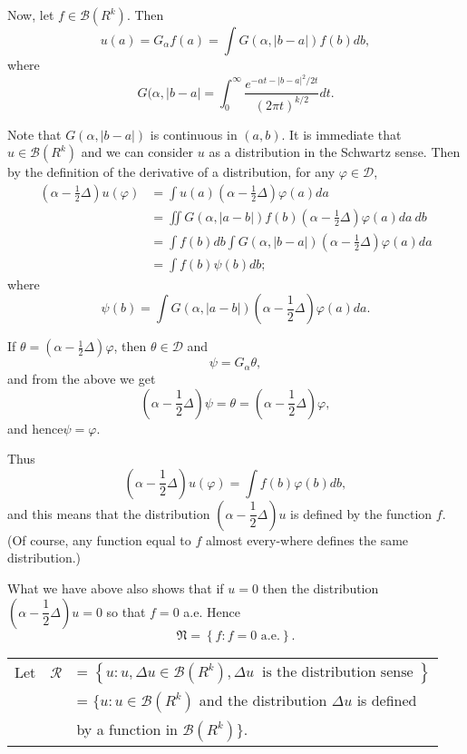 Now, let $f \in \mathscr{B}(R^k)$. Then
$$
u(a) = G_\alpha f (a) = \int G(\alpha, |b-a|)f(b)db,
$$
where 
$$
G(\alpha, |b-a| = \int^\infty_0 \dfrac{e^{- \alpha
    t-|b-a|^2/2t}}{(2 \pi t)^{k/2}} dt.
$$ 

Note that $G(\alpha, |b-a|)$ is continuous in $(a, b)$. It is
immediate that $u \in \mathscr{B}(R^k)$ and we can consider $u$ as a
distribution in the Schwartz sense. Then  by the definition of the
derivative of a distribution, for any $\varphi \in \mathscr{D}$, 
\begin{align*}
\left(\alpha - \frac{1}{2}\Delta\right) u(\varphi) & = \int u(a)
  \left(\alpha -
  \frac{1}{2} \Delta\right)\varphi (a) da \\ 
  & = \iint G(\alpha, |a-b|)f(b) \left(\alpha- \frac{1}{2} \Delta\right) \varphi
  (a) da ~db\\ 
  & =\int f(b) db \int G (\alpha, |b-a|) \left(\alpha- \frac{1}{2} \Delta\right)
  \varphi(a) da \\ 
  & = \int f(b) \psi (b) db ;
\end{align*}\pageoriginale
where
$$
\psi (b) = \int G(\alpha, |a-b|) \left(\alpha -
\frac{1}{2}\Delta\right)\varphi(a) da. 
$$

If $\theta = \left(\alpha - \frac{1}{2} \Delta\right) \varphi$, then $\theta \in
\mathscr{D}$ and   
$$
\psi = G_\alpha \theta,
$$
and from the above we get
$$
\left(\alpha- \frac{1}{2}\Delta\right) \psi = \theta = \left(\alpha -
\frac{1}{2}\Delta \right)\varphi, 
$$
and hence\quad $\psi = \varphi$.

Thus 
$$
\left(\alpha - \frac{1}{2} \Delta\right) u (\varphi) = \int f(b)
\varphi(b) db,  
$$
and this means that the distribution $\left(\alpha - \dfrac{1}{2}
\Delta\right)u$ 
is defined by the function $f$. (Of course, any function equal to $f$
almost every-where defines the same distribution.) 

What we have above also shows that if $u = 0$ then the distribution
$\left(\alpha - \dfrac{1}{2}\Delta\right) u = 0$ so that $f=0$ a.e. Hence 
$$
\mathfrak{N}= \left\{ f : f = 0 \text{ a.e.}\right \}. 
$$
\begin{tabular}{lr@{\;\;}p{8.5cm}}
  Let  & $\mathscr{R}$ & = $\left \{u : u, \Delta u \in \mathscr{B}(R^k),
  \Delta u ~\text{ is the distribution sense } \right \}$\\ 
  & & = $\bigg \{ u : u \in \mathscr{B}(R^k)$  and the distribution
  $\Delta u$ is defined\\ 
  & & \hfill by a function in $\mathscr{B}(R^k)\bigg\}$. 
\end{tabular}

